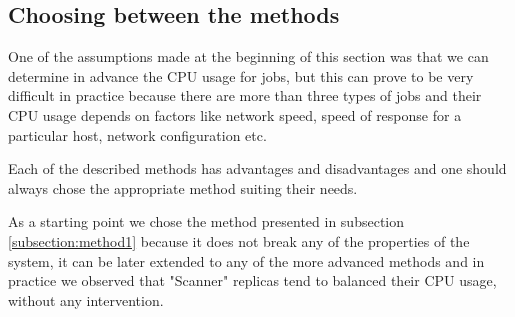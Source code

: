 \subsection{Choosing between the methods}
One of the assumptions made at the beginning of this section was that we can determine in advance the CPU usage for jobs, but this can prove to be very difficult in practice because there are more than three types of jobs and their CPU usage depends on factors like network speed, speed of response for a particular host, network configuration etc.

Each of the described methods has advantages and disadvantages and one should always chose the appropriate method suiting their needs.

As a starting point we chose the method presented in subsection \ref{subsection:method1} because it does not break any of the properties of the system, it can be later extended to any of the more advanced methods and in practice we observed that "Scanner" replicas tend to balanced their CPU usage, without any intervention.